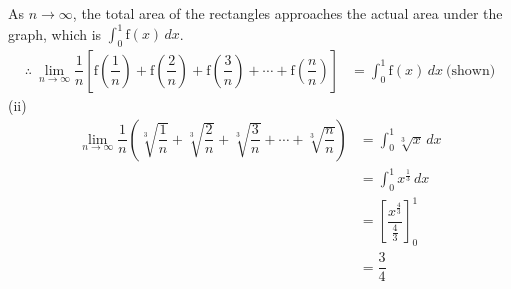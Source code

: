 \documentclass[a4paper,11pt]{book}
\begin{document}
{\begin{wschgblock}
{
}
As $n \to \infty$, the total area of the rectangles approaches the actual area under the graph, which is $\displaystyle\int_0^1 \mathrm{f}(x)\,dx$.\vspace{-2mm}
\begin{align*}
\therefore\ \lim_{n\to\infty} \dfrac{1}{n}\left[\mathrm{f}\left(\dfrac{1}{n}\right) + \mathrm{f}\left(\dfrac{2}{n}\right) + \mathrm{f}\left(\dfrac{3}{n}\right) + \cdots + \mathrm{f}\left(\dfrac{n}{n}\right)\right] &= \int_0^1 \mathrm{f}(x)\,dx \ \text{(shown)}
\end{align*}
(ii)\vspace{-3mm}
\begin{align*}
\lim_{n\to\infty} \dfrac{1}{n}\left(\sqrt[3]{\dfrac{1}{n}} + \sqrt[3]{\dfrac{2}{n}} + \sqrt[3]{\dfrac{3}{n}} + \cdots + \sqrt[3]{\dfrac{n}{n}}\right) &= \int_0^1 \sqrt[3]{x}\,dx \\
&= \int_0^1 x^{\frac{1}{3}}\,dx \\
&= \left[\dfrac{x^{\frac{4}{3}}}{\frac{4}{3}}\right]_0^1 \\
&= \dfrac{3}{4}
\end{align*}
\end{wschgblock}
}
\end{document}
